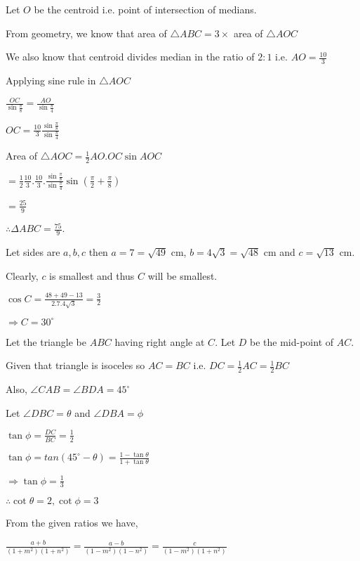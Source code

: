 \item Let $O$ be the centroid i.e. point of intersection of medians.

  From geometry, we know that area of $\triangle ABC = 3\times$ area of $\triangle AOC$

  We also know that centroid divides median in the ratio of $2:1$ i.e. $AO = \frac{10}{3}$

  Applying sine rule in $\triangle AOC$

  $\frac{OC}{\sin\frac{\pi}{8}} = \frac{AO}{\sin\frac{\pi}{4}}$

  $OC = \frac{10}{3}\frac{\sin\frac{\pi}{8}}{\sin\frac{\pi}{4}}$

  Area of $\triangle AOC = \frac{1}{2}AO.OC\sin AOC$

  $= \frac{1}{2}\frac{10}{3}.\frac{10}{3}.\frac{\sin\frac{\pi}{8}}{\sin\frac{\pi}{4}}\sin\left(\frac{\pi}{2} +
  \frac{\pi}{8}\right)$

  $= \frac{25}{9}$

  $\therefore \Delta ABC = \frac{75}{9}.$

\item Let sides are $a, b, c$ then $a = 7 = \sqrt{49}$ cm, $b = 4\sqrt{3} = \sqrt{48}$ cm and $c = \sqrt{13}$
  cm.

  Clearly, $c$ is smallest and thus $C$ will be smallest.

  $\cos C = \frac{48 + 49 - 13}{2.7.4\sqrt{3}} = \frac{3}{2}$

  $\Rightarrow C = 30^\circ$

\item Let the triangle be $ABC$ having right angle at $C.$ Let $D$ be the mid-point of $AC.$

  Given that triangle is isoceles so $AC = BC$ i.e. $DC = \frac{1}{2}AC = \frac{1}{2}BC$

  Also, $\angle CAB = \angle BDA = 45^\circ$

  Let $\angle DBC = \theta$ and $\angle DBA = \phi$

  $\tan\phi = \frac{DC}{BC}= \frac{1}{2}$

  $\tan\phi = tan(45^\circ - \theta) = \frac{1 - \tan\theta}{1 + \tan\theta}$

  $\Rightarrow \tan\phi = \frac{1}{3}$

  $\therefore \cot\theta = 2, \cot\phi = 3$

\item From the given ratios we have,

  $\frac{a + b}{(1 + m^2)(1 + n^2)}= \frac{a - b}{(1 - m^2)(1 - n^2)} = \frac{c}{(1 - m^2)(1 + n^2)}$

